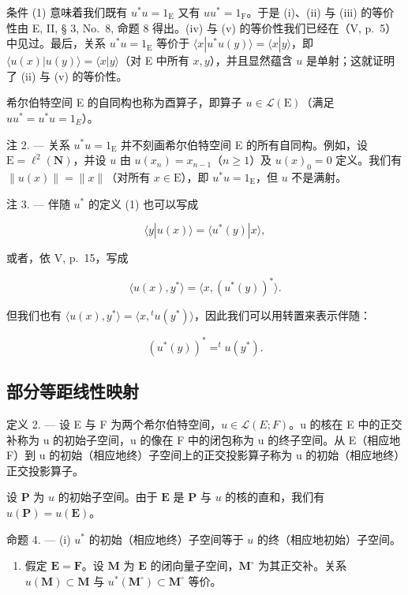 条件 (1) 意味着我们既有 \(u^{*}u = 1_{\mathrm{E}}\) 又有 \(uu^{*} = 1_{\mathrm{F}}\)。于是 (i)、(ii) 与 (iii) 的等价性由 E, II, § 3, No.~8, 命题 8 得出。(iv) 与 (v) 的等价性我们已经在（V, p.~5）中见过。最后，关系 \(u^{*}u = 1_{\mathrm{E}}\) 等价于 \(\langle x|u^{*}u(y)\rangle = \langle x|y\rangle\)，即 \(\langle u(x)|u(y)\rangle = \langle x|y\rangle\)（对 E 中所有 \(x,y\)），并且显然蕴含 \(u\) 是单射；这就证明了 (ii) 与 (v) 的等价性。

希尔伯特空间 E 的自同构也称为酉算子，即算子 \(u \in \mathcal{L}(\mathrm{E})\)（满足 \(uu^{*} = u^{*}u = 1_{E}\)）。

注 2. --- 关系 \(u^{*}u = 1_{\mathrm{E}}\) 并不刻画希尔伯特空间 E 的所有自同构。例如，设 \(\mathrm{E} = \ell^2 (\mathbf{N})\)，并设 \(u\) 由 \(u(x_{n}) = x_{n - 1}\)（\(n\geqslant 1\)）及 \(u(x)_0 = 0\) 定义。我们有 \(\| u(x)\| = \| x\|\)（对所有 \(x\in \mathrm{E}\)），即 \(u^{*}u = 1_{\mathrm{E}}\)，但 \(u\) 不是满射。

注 3. --- 伴随 \(u^{*}\) 的定义 (1) 也可以写成

\[
\langle y | u (x) \rangle = \langle u ^ {*} (y) | x \rangle ,
\]

或者，依 V, p.~15，写成

\[
\langle u (x), y ^ {*} \rangle = \langle x, (u ^ {*} (y)) ^ {*} \rangle .
\]

但我们也有 \(\langle u(x), y^* \rangle = \langle x, {}^t u(y^*) \rangle\)，因此我们可以用转置来表示伴随：

\[
(u ^ {*} (y)) ^ {*} = ^ {t} u (y ^ {*}).
\]

\subsection{部分等距线性映射}

定义 2. --- 设 E 与 F 为两个希尔伯特空间，\(u \in \mathcal{L}(E; F)\)。u 的核在 E 中的正交补称为 u 的初始子空间，u 的像在 F 中的闭包称为 u 的终子空间。从 E（相应地 F）到 u 的初始（相应地终）子空间上的正交投影算子称为 u 的初始（相应地终）正交投影算子。

设 \(\mathbf{P}\) 为 \(u\) 的初始子空间。由于 \(\mathbf{E}\) 是 \(\mathbf{P}\) 与 \(u\) 的核的直和，我们有 \(u(\mathbf{P}) = u(\mathbf{E})\)。

命题 4. --- (i) \(u^*\) 的初始（相应地终）子空间等于 \(u\) 的终（相应地初始）子空间。

\begin{enumerate}
\def\labelenumi{(\roman{enumi})}
\setcounter{enumi}{1}
\tightlist
\item
  假定 \(\mathbf{E} = \mathbf{F}\)。设 \(\mathbf{M}\) 为 \(\mathbf{E}\) 的闭向量子空间，\(\mathbf{M}^{\circ}\) 为其正交补。关系 \(u(\mathbf{M}) \subset \mathbf{M}\) 与 \(u^{*}(\mathbf{M}^{\circ}) \subset \mathbf{M}^{\circ}\) 等价。
\end{enumerate}

